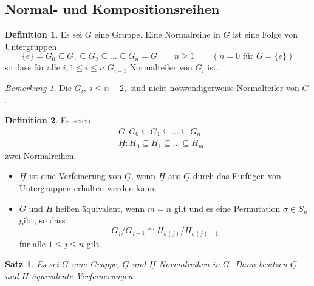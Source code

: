 \documentclass[12pt]{scrartcl}%
\newtheorem{thm}{Satz}
\theoremstyle{definition}
\newtheorem*{defn}{Definition}
\theoremstyle{remark}
\newtheorem*{nb}{Bemerkung}
\begin{document}
\subsection{Normal- und Kompositionsreihen}

\begin{defn}
    Es sei $G$ eine Gruppe. Eine Normalreihe in $G$ ist eine Folge von Untergruppen
        \[ \{e\} = G_0 \subseteq G_1 \subseteq G_2 \subseteq\dots\subseteq G_n=G\qquad n\geq 1\qquad(n=0\text{ für } G=\{e\})\]
    so dass für alle $i,1\leq i\leq n$ $G_{i-1}$ Normalteiler von $G_i$ ist.
\end{defn}

\begin{nb}
    Die $G_i,\;i\leq n-2,$ sind nicht notwendigerweise Normalteiler von $G$.
\end{nb}

\begin{defn}
    Es seien 
        \[\begin{split}
            &\underline{G}: G_0\subseteq G_1 \subseteq\dots\subseteq G_n \\
            &\underline{H}: H_0\subseteq H_1\subseteq\dots\subseteq H_m 
        \end{split}\]
    zwei Normalreihen.
    \begin{itemize}
        \item $\underline{H}$ ist eine Verfeinerung von $\underline{G}$, wenn $\underline{H}$ aus $\underline{G}$ durch das Einfügen von Untergruppen erhalten werden kann.
        \item $\underline{G}$ und $\underline{H}$ heißen äquivalent, wenn $m=n$ gilt und es eine Permutation $\sigma\in S_n$ gibt, so dass 
        \[ G_j/G_{j-1}\cong H_{\sigma(j)}/H_{\sigma(j)-1}\]
            für alle $1\leq j\leq n$ gilt.
    \end{itemize}
\end{defn}

\begin{thm}
Es sei $G$ eine Gruppe, $\underline{G}$ und $\underline{H}$ Normalreihen in $G$. Dann besitzen $\underline{G}$ und $\underline{H}$ äquivalente Verfeinerungen.
\end{thm}
\end{document}
